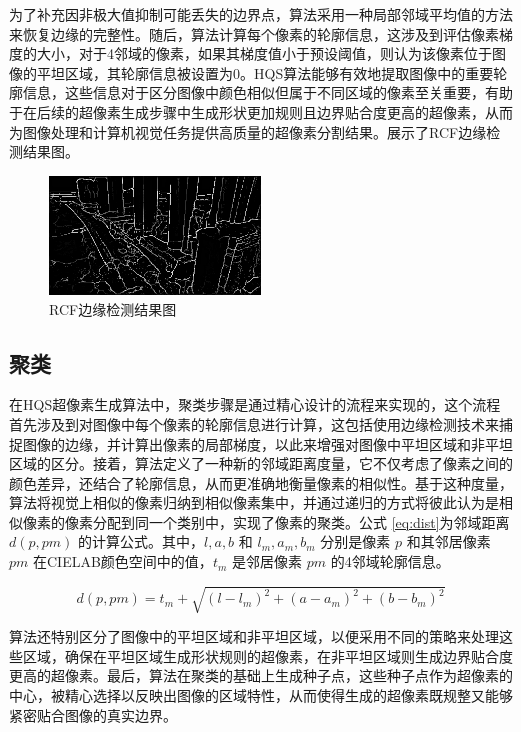 为了补充因非极大值抑制可能丢失的边界点，算法采用一种局部邻域平均值的方法来恢复边缘的完整性。随后，算法计算每个像素的轮廓信息，这涉及到评估像素梯度的大小，对于4邻域的像素，如果其梯度值小于预设阈值，则认为该像素位于图像的平坦区域，其轮廓信息被设置为0。HQS算法能够有效地提取图像中的重要轮廓信息，这些信息对于区分图像中颜色相似但属于不同区域的像素至关重要，有助于在后续的超像素生成步骤中生成形状更加规则且边界贴合度更高的超像素，从而为图像处理和计算机视觉任务提供高质量的超像素分割结果。展示了RCF边缘检测结果图。

\begin{figure}[htbp]
	\centering
    \includegraphics[width=0.5\textwidth]{pic/rcf/2.png}
	\caption{RCF边缘检测结果图}
      \label{fig:RCF}
\end{figure}

\newpage

\subsection{聚类}
在HQS超像素生成算法中，聚类步骤是通过精心设计的流程来实现的，这个流程首先涉及到对图像中每个像素的轮廓信息进行计算，这包括使用边缘检测技术来捕捉图像的边缘，并计算出像素的局部梯度，以此来增强对图像中平坦区域和非平坦区域的区分。接着，算法定义了一种新的邻域距离度量，它不仅考虑了像素之间的颜色差异，还结合了轮廓信息，从而更准确地衡量像素的相似性。基于这种度量，算法将视觉上相似的像素归纳到相似像素集中，并通过递归的方式将彼此认为是相似像素的像素分配到同一个类别中，实现了像素的聚类。\cite{achanta2012slic}公式 \eqref{eq:dist}为邻域距离 \( d(p, pm) \) 的计算公式。其中，\( l, a, b \) 和 \( l_m, a_m, b_m \) 分别是像素 \( p \) 和其邻居像素 \( pm \) 在CIELAB颜色空间中的值，\( t_m \) 是邻居像素 \( pm \) 的4邻域轮廓信息。

\begin{equation}
  d(p, pm) = t_m + \sqrt{(l - l_m)^2 + (a - a_m)^2 + (b - b_m)^2}
  \label{eq:dist}
\end{equation}

算法还特别区分了图像中的平坦区域和非平坦区域，以便采用不同的策略来处理这些区域，确保在平坦区域生成形状规则的超像素，在非平坦区域则生成边界贴合度更高的超像素。最后，算法在聚类的基础上生成种子点，这些种子点作为超像素的中心，被精心选择以反映出图像的区域特性，从而使得生成的超像素既规整又能够紧密贴合图像的真实边界。

